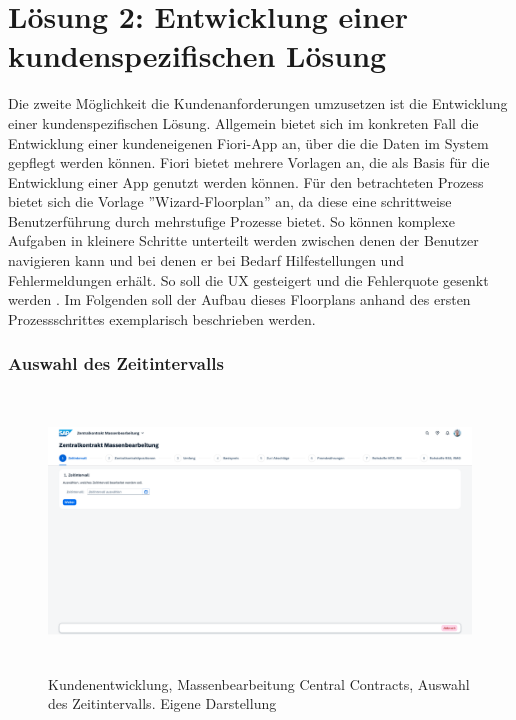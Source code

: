 \section{Lösung 2: Entwicklung einer kundenspezifischen Lösung}

Die zweite Möglichkeit die Kundenanforderungen umzusetzen ist die Entwicklung einer kundenspezifischen Lösung. Allgemein bietet sich im konkreten Fall die Entwicklung einer kundeneigenen Fiori-App an, über die die Daten im System gepflegt werden können. Fiori bietet mehrere Vorlagen an, die als Basis für die Entwicklung einer App genutzt werden können. Für den betrachteten Prozess bietet sich die Vorlage ''Wizard-Floorplan'' an, da diese eine schrittweise Benutzerführung durch mehrstufige Prozesse bietet. So können komplexe Aufgaben in kleinere Schritte unterteilt werden zwischen denen der Benutzer navigieren kann und bei denen er bei Bedarf Hilfestellungen und Fehlermeldungen erhält. So soll die UX gesteigert und die Fehlerquote gesenkt werden \parencite[Vgl.][]{praxis_sap_wizard_floorplan_2024}. Im Folgenden soll der Aufbau dieses Floorplans anhand des ersten Prozessschrittes exemplarisch beschrieben werden.

\subsubsection{Auswahl des Zeitintervalls}

\begin{figure}[H]
    \centering
    \includegraphics[height=7.37cm]{Bilder/Praxisteil-KL-Schritt-1.png}
    \caption[Kundenentwicklung, Massenbearbeitung Central Contracts, Auswahl des Zeitintervalls]{Kundenentwicklung, Massenbearbeitung Central Contracts, Auswahl des Zeitintervalls. Eigene Darstellung}
    \label{fig:PraxisKLSchritt1}
\end{figure}


